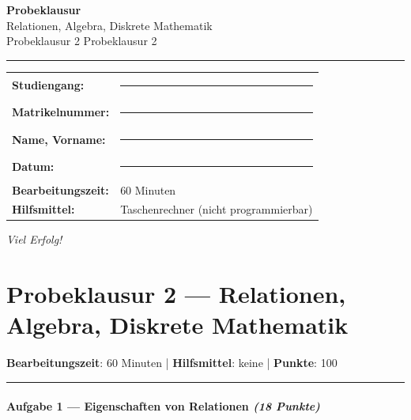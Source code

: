 \documentclass[11pt, a4paper]{article}
\providecommand{\nichttitle}{Probeklausur}
\providecommand{\nichtsubtitle}{}
\renewcommand{\nichttitle}{Relationen, Algebra, Diskrete Mathematik}
\renewcommand{\nichtsubtitle}{Probeklausur 2}
\begin{document}
\thispagestyle{empty}
\begin{center}
\vspace*{1cm}
{\Huge\bfseries\color{accent}Probeklausur}\\[8pt]
{\Large\color{accent}\nichttitle}\\[4pt]
\ifx\nichtsubtitle\empty\else
  {\large\color{accent!80!black}\nichtsubtitle}\\[6pt]
\fi
\color{accent}\rule{0.5\linewidth}{1pt}\color{black}
\end{center}

\vspace{1cm}
\begin{tabularx}{\textwidth}{@{}l X@{}}
\textbf{Studiengang:}      & \rule{6cm}{0.4pt} \\[6pt]
\textbf{Matrikelnummer:}    & \rule{6cm}{0.4pt} \\[6pt]
\textbf{Name, Vorname:}    & \rule{6cm}{0.4pt} \\[6pt]
\textbf{Datum:}             & \rule{6cm}{0.4pt} \\[6pt]
\textbf{Bearbeitungszeit:}  & 60 Minuten \\[6pt]
\textbf{Hilfsmittel:}       & Taschenrechner (nicht programmierbar) \\
\end{tabularx}

\vspace{2cm}
\begin{center}
{\large\itshape Viel Erfolg!}
\end{center}

\newpage


\section{Probeklausur 2 — Relationen, Algebra, Diskrete Mathematik}

\textbf{Bearbeitungszeit}: 60 Minuten | \textbf{Hilfsmittel}: keine | \textbf{Punkte}: 100



\noindent\textcolor{rulegray}{\rule{\linewidth}{0.4pt}}


\paragraph{Aufgabe 1 — Eigenschaften von Relationen \textit{(18 Punkte)}}\mbox{}\\[2pt]
\end{document}
